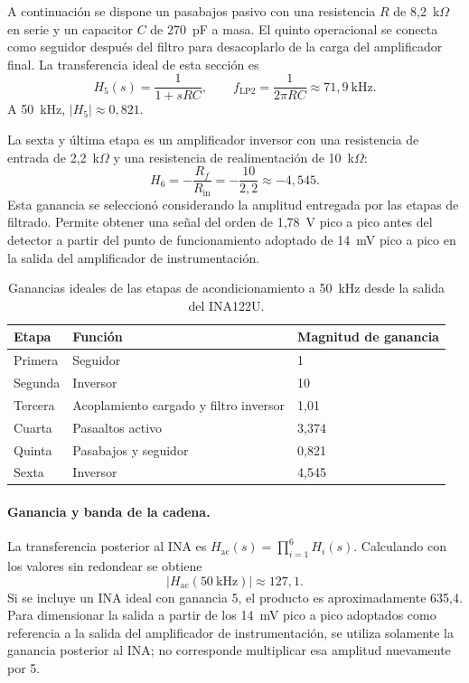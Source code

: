 \documentclass[12pt,a4paper]{article}
\begin{document}
A continuación se dispone un pasabajos pasivo con una resistencia $R$ de 8,2~k$\Omega$ en serie
y un capacitor $C$ de 270~pF a masa. El quinto operacional se conecta como seguidor después del
filtro para desacoplarlo de la carga del amplificador final. La transferencia ideal de esta sección es
\begin{equation}
    H_5(s)=\frac{1}{1+sRC},\qquad
    f_{\mathrm{LP2}}=\frac{1}{2\pi RC}\approx71{,}9~\mathrm{kHz}.
\end{equation}
A 50~kHz, $|H_5|\approx0{,}821$.

La sexta y última etapa es un amplificador inversor con una resistencia de entrada de 2,2~k$\Omega$
y una resistencia de realimentación de 10~k$\Omega$:
\begin{equation}
    H_6=-\frac{R_f}{R_{\mathrm{in}}}=-\frac{10}{2{,}2}\approx-4{,}545.
\end{equation}
Esta ganancia se seleccionó considerando la amplitud entregada por las etapas de filtrado.
Permite obtener una señal del orden de 1,78~V pico a pico antes del detector a partir del
punto de funcionamiento adoptado de 14~mV pico a pico en la salida del amplificador de instrumentación.

\begin{table}[htbp]
    \centering
    \caption{Ganancias ideales de las etapas de acondicionamiento a 50~kHz desde la salida del INA122U.}
    \label{tab:cadena_acondicionamiento}
    \begin{tabular}{lll}
        \hline
        Etapa & Función & Magnitud de ganancia \\
        \hline
        Primera & Seguidor & 1 \\
        Segunda & Inversor & 10 \\
        Tercera & Acoplamiento cargado y filtro inversor & 1,01 \\
        Cuarta & Pasaaltos activo & 3,374 \\
        Quinta & Pasabajos y seguidor & 0,821 \\
        Sexta & Inversor & 4,545 \\
        \hline
    \end{tabular}
\end{table}

\paragraph{Ganancia y banda de la cadena.}
La transferencia posterior al INA es $H_{\mathrm{ac}}(s)=\prod_{i=1}^{6}H_i(s)$.
Calculando con los valores sin redondear se obtiene
\begin{equation}
    |H_{\mathrm{ac}}(50~\mathrm{kHz})|\approx127{,}1.
\end{equation}
Si se incluye un INA ideal con ganancia 5, el producto es aproximadamente 635,4. Para dimensionar
la salida a partir de los 14~mV pico a pico adoptados como referencia a la salida del amplificador
de instrumentación, se utiliza solamente la ganancia posterior al INA; no corresponde
multiplicar esa amplitud nuevamente por 5.
\end{document}
